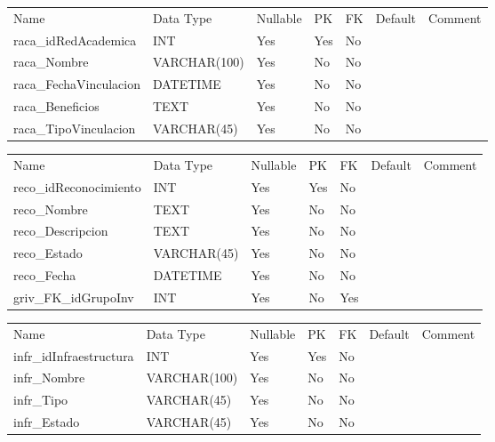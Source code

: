 			\begin{center}
				\begin{tabular}{ |l|l|l|l|l|l|l| }
					\hline
					Name & Data Type & Nullable & PK & FK & Default & Comment \\
					raca_idRedAcademica & INT & Yes & Yes & No &  & \\ \hline 
raca_Nombre & VARCHAR(100) & Yes & No & No &  & \\ \hline 
raca_FechaVinculacion & DATETIME & Yes & No & No &  & \\ \hline 
raca_Beneficios & TEXT & Yes & No & No &  & \\ \hline 
raca_TipoVinculacion & VARCHAR(45) & Yes & No & No &  & \\ \hline 

				\end{tabular}
			\end{center}
		

			\begin{center}
				\begin{tabular}{ |l|l|l|l|l|l|l| }
					\hline
					Name & Data Type & Nullable & PK & FK & Default & Comment \\
					reco_idReconocimiento & INT & Yes & Yes & No &  & \\ \hline 
reco_Nombre & TEXT & Yes & No & No &  & \\ \hline 
reco_Descripcion & TEXT & Yes & No & No &  & \\ \hline 
reco_Estado & VARCHAR(45) & Yes & No & No &  & \\ \hline 
reco_Fecha & DATETIME & Yes & No & No &  & \\ \hline 
griv_FK_idGrupoInv & INT & Yes & No & Yes &  & \\ \hline 

				\end{tabular}
			\end{center}
		

			\begin{center}
				\begin{tabular}{ |l|l|l|l|l|l|l| }
					\hline
					Name & Data Type & Nullable & PK & FK & Default & Comment \\
					infr_idInfraestructura & INT & Yes & Yes & No &  & \\ \hline 
infr_Nombre & VARCHAR(100) & Yes & No & No &  & \\ \hline 
infr_Tipo & VARCHAR(45) & Yes & No & No &  & \\ \hline 
infr_Estado & VARCHAR(45) & Yes & No & No &  & \\ \hline 

				\end{tabular}
			\end{center}
		

